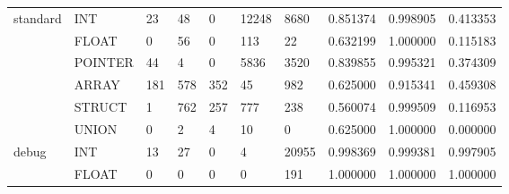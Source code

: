 \begin{table}[t]
\begin{tabular}{lp{2.0cm}p{2.0cm}p{2.0cm}p{2.0cm}p{2.0cm}p{2.0cm}p{2.0cm}p{2.0cm}p{2.0cm}}
\cline{1-10}
\multirow{6}{*}{standard} & INT &                                 23 &                                48 &                                0 &                             12248 &                            8680 &                        0.851374 &                               0.998905 &                             0.413353 \\
      & FLOAT &                                  0 &                                56 &                                0 &                               113 &                              22 &                        0.632199 &                               1.000000 &                             0.115183 \\
      & POINTER &                                 44 &                                 4 &                                0 &                              5836 &                            3520 &                        0.839855 &                               0.995321 &                             0.374309 \\
      & ARRAY &                                181 &                               578 &                              352 &                                45 &                             982 &                        0.625000 &                               0.915341 &                             0.459308 \\
      & STRUCT &                                  1 &                               762 &                              257 &                               777 &                             238 &                        0.560074 &                               0.999509 &                             0.116953 \\
      & UNION &                                  0 &                                 2 &                                4 &                                10 &                               0 &                        0.625000 &                               1.000000 &                             0.000000 \\
\cline{1-10}
\multirow{6}{*}{debug} & INT &                                 13 &                                27 &                                0 &                                 4 &                           20955 &                        0.998369 &                               0.999381 &                             0.997905 \\
      & FLOAT &                                  0 &                                 0 &                                0 &                                 0 &                             191 &                        1.000000 &                               1.000000 &                             1.000000 \\

\end{tabular}
\end{table}
